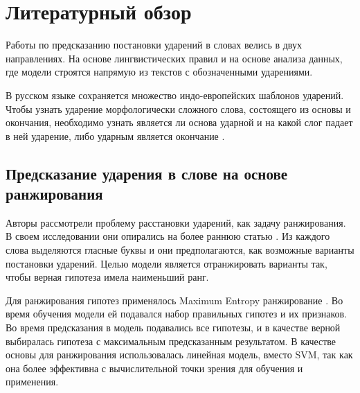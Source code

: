 \documentclass[14pt, a4paper, russian]{extreport}
\begin{document}
\newpage

\chapter{Литературный обзор}

Работы по предсказанию постановки ударений в словах велись в двух направлениях. На основе лингвистических правил \cite{church, williams} и на основе анализа данных, где модели строятся напрямую из текстов с обозначенными ударениями. 

В русском языке сохраняется множество индо-европейских шаблонов ударений. Чтобы узнать ударение морфологически сложного слова, состоящего из основы и окончания, необходимо узнать является ли основа ударной и на какой слог падает в ней ударение, либо ударным является окончание \cite{halle}.
\section{Предсказание ударения в слове на основе ранжирования}
Авторы \cite{hall} рассмотрели проблему расстановки ударений, как задачу ранжирования. В своем исследовании  они опирались на более раннюю статью \cite{dou}. Из каждого слова выделяются гласные буквы и они предполагаются, как возможные варианты постановки ударений. Целью модели является отранжировать варианты так, чтобы верная гипотеза имела наименьший ранг.

Для ранжирования гипотез применялось Maximum Entropy ранжирование \cite{collins}. Во время обучения модели ей подавался набор правильных гипотез и их признаков. Во время предсказания в модель подавались все гипотезы, и в качестве верной выбиралась гипотеза с максимальным предсказанным результатом. В качестве основы для ранжирования использовалась линейная модель, вместо SVM, так как она более эффективна с вычислительной точки зрения для обучения и применения. 
\end{document}
